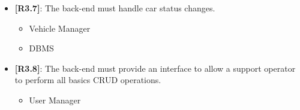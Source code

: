 \begin{itemize}
	\item {\textbf{[R3.7]}}: The back-end must handle car status changes.
	\begin{itemize}
	\item Vehicle Manager
	\item DBMS\\
	\end{itemize}
	
	\item {\textbf{[R3.8]}}: The back-end must provide an interface to allow a support operator to perform all basics CRUD operations.
	\begin{itemize}
	\item User Manager\\
	\end{itemize}

\end{itemize}






